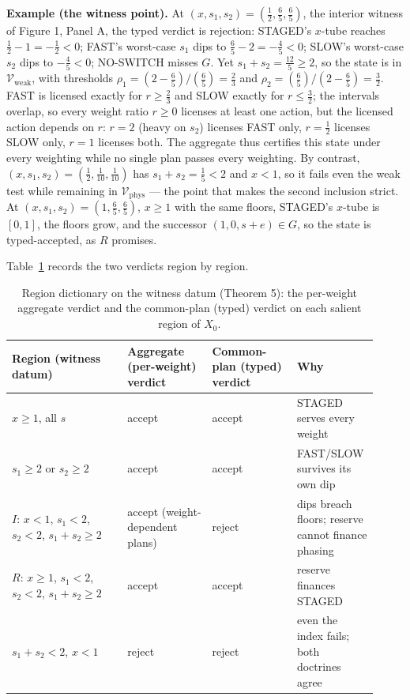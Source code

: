 \documentclass[review,11pt]{elsarticle}
\begin{document}
\textbf{Example (the witness point).} At \((x, s_1, s_2) = (\tfrac12, \tfrac65, \tfrac65)\), the interior witness of Figure 1, Panel A, the typed verdict is rejection: STAGED's \(x\)-tube reaches \(\tfrac12 - 1 = -\tfrac12 < 0\); FAST's worst-case \(s_1\) dips to \(\tfrac65 - 2 = -\tfrac45 < 0\); SLOW's worst-case \(s_2\) dips to \(-\tfrac45 < 0\); NO-SWITCH misses \(G\). Yet \(s_1 + s_2 = \tfrac{12}{5} \ge 2\), so the state is in \(\mathcal{V}_{\mathrm{weak}}\), with thresholds \(\rho_1 = (2 - \tfrac65)/(\tfrac65) = \tfrac23\) and \(\rho_2 = (\tfrac65)/(2 - \tfrac65) = \tfrac32\). FAST is licensed exactly for \(r \ge \tfrac23\) and SLOW exactly for \(r \le \tfrac32\); the intervals overlap, so every weight ratio \(r \ge 0\) licenses at least one action, but the licensed action depends on \(r\): \(r = 2\) (heavy on \(s_2\)) licenses FAST only, \(r = \tfrac12\) licenses SLOW only, \(r = 1\) licenses both. The aggregate thus certifies this state under every weighting while no single plan passes every weighting. By contrast, \((x, s_1, s_2) = (\tfrac12, \tfrac1{10}, \tfrac1{10})\) has \(s_1 + s_2 = \tfrac15 < 2\) and \(x < 1\), so it fails even the weak test while remaining in \(\mathcal{V}_{\mathrm{phys}}\) --- the point that makes the second inclusion strict. At \((x, s_1, s_2) = (1, \tfrac65, \tfrac65)\), \(x \ge 1\) with the same floors, STAGED's \(x\)-tube is \([0, 1]\), the floors grow, and the successor \((1, 0, s + e) \in G\), so the state is typed-accepted, as \(R\) promises.

Table~\ref{tab:regions} records the two verdicts region by region.

\begin{table}[htbp]
\centering
\small
\begin{tabular}{@{}p{0.30\linewidth}p{0.22\linewidth}p{0.22\linewidth}p{0.18\linewidth}@{}}
\toprule
Region (witness datum) & Aggregate (per-weight) verdict & Common-plan (typed) verdict & Why \\
\midrule
$x \ge 1$, all $s$ & accept & accept & STAGED serves every weight \\
$s_1 \ge 2$ or $s_2 \ge 2$ & accept & accept & FAST/SLOW survives its own dip \\
$I$: $x < 1$, $s_1 < 2$, $s_2 < 2$, $s_1 + s_2 \ge 2$ & accept (weight-dependent plans) & reject & dips breach floors; reserve cannot finance phasing \\
$R$: $x \ge 1$, $s_1 < 2$, $s_2 < 2$, $s_1 + s_2 \ge 2$ & accept & accept & reserve finances STAGED \\
$s_1 + s_2 < 2$, $x < 1$ & reject & reject & even the index fails; both doctrines agree \\
\bottomrule
\end{tabular}
\caption{Region dictionary on the witness datum (Theorem 5): the per-weight aggregate verdict and the common-plan (typed) verdict on each salient region of \(X_0\).}
\label{tab:regions}
\end{table}
\end{document}
